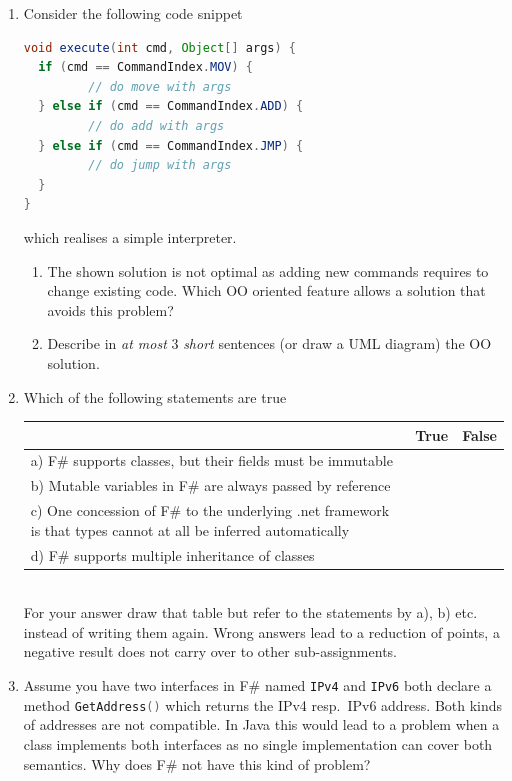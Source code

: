 \documentclass{article}
\newcommand{\comment}[1]{\marginpar{#1}}
\begin{document}
\begin{enumerate}
\item Consider the following code snippet
\begin{lstlisting}[language=Java, columns=flexible, basicstyle=\small]
void execute(int cmd, Object[] args) {
  if (cmd == CommandIndex.MOV) { 
         // do move with args 
  } else if (cmd == CommandIndex.ADD) {
         // do add with args
  } else if (cmd == CommandIndex.JMP) {
         // do jump with args
  }
}
\end{lstlisting}
which realises a simple interpreter. 
\begin{enumerate}
\item The shown solution is not optimal as adding new commands
  requires to change existing code. Which OO oriented feature allows a
  solution that avoids this problem? \comment{\textbf{1 point}}
\item Describe in \emph{at most} 3 \emph{short} sentences (or draw a
  UML diagram) the OO solution. \comment{\textbf{3 points}}
\end{enumerate}
\item Which of the following statements are true\\
    \begin{tabular}{|p{6cm}|c|c|}\hline
      & True & False \\ \hline
     a) F\# supports classes, but their fields must be immutable & & \\\hline
     b) Mutable variables in F\# are always passed by reference & & \\\hline
     c) One concession of F\#  to the underlying \textsf{.net}
     framework is that types cannot at all be inferred automatically & & \\\hline
     d) F\# supports multiple inheritance of classes & & \\\hline
   \end{tabular}\\
   For your answer draw that table but refer to the statements by a),
   b) etc. instead of writing them again. Wrong answers lead to a
   reduction of points, a negative result does not carry over to other
   sub-assignments. \comment{\textbf{2 points}}
 \item Assume you have two interfaces in F\# named
   \lstinline[language=FSharp]{IPv4} and
   \lstinline[language=FSharp]{IPv6} both declare a method
   \lstinline[language=FSharp]{GetAddress()} which returns the IPv4
   resp.\ IPv6 address. Both kinds of addresses are not compatible. In
   Java this would lead to a problem when a class implements both
   interfaces as no single implementation can cover both
   semantics. Why does F\# not have this kind of problem?  \comment{\textbf{1 point}}
\end{enumerate}
\end{document}
